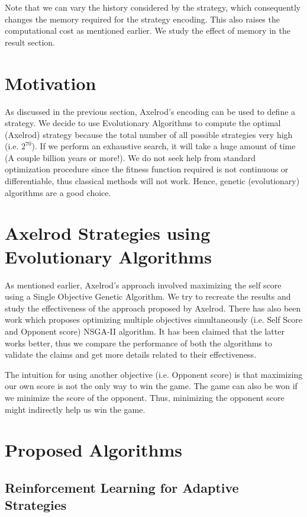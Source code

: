 \documentclass[a4paper]{article}
\begin{document}
	Note that we can vary the history considered by the strategy, which consequently changes the memory required for the strategy encoding. This also raises the computational cost as mentioned earlier. We study the effect of memory in the result section.
	
	\section{Motivation}
	
	As discussed in the previous section, Axelrod's encoding can be used to define a strategy. We decide to use Evolutionary Algorithms to compute the optimal (Axelrod) strategy because the total number of all possible strategies very high (i.e. $2^{70}$). If we perform an exhaustive search, it will take a huge amount of time (A couple billion years or more!). We do not seek help from standard optimization procedure since the fitness function required is not continuous or differentiable, thus classical methods will not work. Hence, genetic (evolutionary) algorithms are a good choice.

	\section{Axelrod Strategies using Evolutionary Algorithms}

	As mentioned earlier, Axelrod's approach involved maximizing the self score using a Single Objective Genetic Algorithm. We try to recreate the results and study the effectiveness of the approach proposed by Axelrod. There has also been work which proposes optimizing multiple objectives simultaneously (i.e. Self Score and Opponent score) NSGA-II algorithm. It has been claimed that the latter works better, thus we compare the performance of both the algorithms to validate the claims and get more details related to their effectiveness.
	
	The intuition for using another objective (i.e. Opponent score) is that maximizing our own score is not the only way to win the game. The game can also be won if we minimize the score of the opponent. Thus, minimizing the opponent score might indirectly help us win the game.
	
	\section{Proposed Algorithms}
	
	\subsection{Reinforcement Learning for Adaptive Strategies}
	
\end{document}
